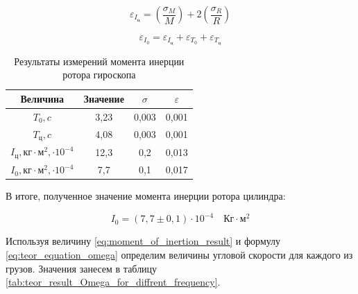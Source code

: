 \documentclass[12pt,a4paper]{article}
\begin{document}
\begin{equation}
	\varepsilon_{I_{\text{ц}}} = \left(\frac{\sigma_{M}}{M}\right) + 2\left(\frac{\sigma_{R}}{R}\right)
\end{equation}	

\begin{equation}
	\varepsilon_{I_{0}} = \varepsilon_{I_{\text{ц}}} + \varepsilon_{T_{0}} + \varepsilon_{T_{\text{ц}}}
\end{equation}

\begin{table}[h!]
	\centering
	\begin{tabular}{|c|c|c|c|}
		\hline
		 Величина     & Значение    & $\sigma$   & $\varepsilon$  \\ \hline
		$T_{0}, c$   & 3,23    & 0,003   & 0,001    \\ \hline
		$T_{\text{ц}}, c$  & 4,08    & 0,003   & 0,001    \\ \hline
		$I_{\text{ц}}, \text{кг}\cdot \text{м}^{2}, \cdot 10^{-4}$  & 12,3 & 0,2 & 0,013 \\ \hline
		$I_{\text{0}}, \text{кг}\cdot \text{м}^{2}, \cdot 10^{-4}$ & 7,7 & 0,1 & 0,017 \\ \hline
	\end{tabular}
	\caption{Результаты измерений момента инерции ротора гироскопа}
	\label{tab:results_of_measuring_moment}
\end{table}

В итоге, полученное значение момента инерции ротора цилиндра:

\begin{equation}
	I_{0} = \left( 7,7 \pm 0,1 \right) \cdot 10^{-4}\quad \text{Кг} \cdot \text{м}^{2}
	\label{eq:moment_of_inertion_result}
\end{equation} 

Используя величину \ref{eq:moment_of_inertion_result} и формулу \ref{eq:teor_equation_omega} определим величины угловой скорости для каждого из грузов. Значения занесем в таблицу \ref{tab:teor_result_Omega_for_diffrent_frequency}.
\end{document}
